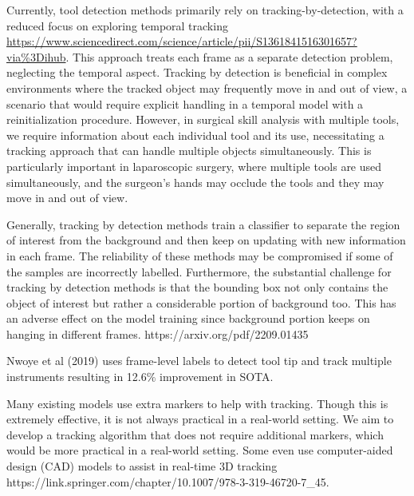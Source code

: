 Currently, tool detection methods primarily rely on tracking-by-detection, with a reduced focus on exploring temporal tracking \url{https://www.sciencedirect.com/science/article/pii/S1361841516301657?via%3Dihub}. This approach treats each frame as a separate detection problem, neglecting the temporal aspect. Tracking by detection is beneficial in complex environments where the tracked object may frequently move in and out of view, a scenario that would require explicit handling in a temporal model with a reinitialization procedure. However, in surgical skill analysis with multiple tools, we require information about each individual tool and its use, necessitating a tracking approach that can handle multiple objects simultaneously. This is particularly important in laparoscopic surgery, where multiple tools are used simultaneously, and the surgeon's hands may occlude the tools and they may move in and out of view.

Generally, tracking by detection methods train a classifier to separate the region of interest from the background and then keep on updating with new information in each frame. The reliability of these methods may be compromised if some of the samples are incorrectly labelled. Furthermore, the substantial challenge for tracking by detection methods is that the bounding box not only contains the object of interest but rather a considerable portion of background too. This has an adverse effect on the model training since background portion keeps on hanging in different frames. https://arxiv.org/pdf/2209.01435

Nwoye et al (2019) uses frame-level labels to detect tool tip and track multiple instruments resulting in 12.6\% improvement in SOTA.

Many existing models use extra markers to help with tracking. Though this is extremely effective, it is not always practical in a real-world setting. We aim to develop a tracking algorithm that does not require additional markers, which would be more practical in a real-world setting. 
Some even use computer-aided design (CAD) models to assist in real-time 3D tracking https://link.springer.com/chapter/10.1007/978-3-319-46720-7_45.

